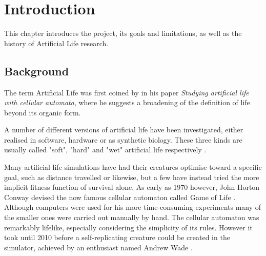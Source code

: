 \chapter{Introduction}
This chapter introduces the project, its goals and limitations, as well as the history of Artificial Life research. 

\section{Background} \label{Section_ref}

The term Artificial Life was first coined by \cite{langton1986studying} in his paper \emph{Studying artificial life with cellular automata}, where he suggests a broadening of the definition of life beyond its organic form.



A number of different versions of artificial life have been investigated, either realised in software, hardware or as synthetic biology. These three kinds are usually called "soft", "hard" and "wet" artificial life respectively \citep{bedau2003artificial}.




Many artificial life simulations have had their creatures optimise toward a specific goal, such as distance travelled or likewise, but a few have instead tried the more implicit fitness function of survival alone. As early as 1970 however, John Horton Conway devised the now famous cellular automaton called Game of Life \citep{gardner1970mathematical}. Although computers were used for his more time-consuming experiments many of the smaller ones were carried out manually by hand. The cellular automaton was remarkably lifelike, especially considering the simplicity of its rules. However it took until 2010 before a self-replicating creature could be created in the simulator, achieved by an enthusiast named Andrew Wade \citep{aron2013first}.

